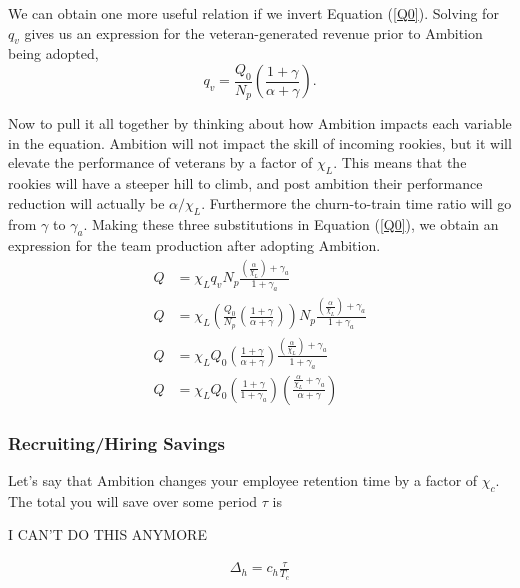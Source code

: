 \documentclass[paper=a4, fontsize=11pt abstract]{scrartcl}
\numberwithin{equation}{section}		%
\numberwithin{figure}{section}			%
\numberwithin{table}{section}				%
\begin{document}
We can obtain one more useful relation if we invert Equation (\ref{Q0}).  Solving for $q_{v}$ gives us an expression for the veteran-generated revenue prior to Ambition being adopted,
\begin{equation}
    q_{v} = \frac{Q_0}{N_p}\left(\frac{1 + \gamma}{\alpha + \gamma}\right).
\end{equation}

Now to pull it all together by thinking about how Ambition impacts each variable in the equation.  Ambition will not impact the skill of incoming rookies, but it will elevate the performance of veterans by a factor of $\chi_L$.  This means that the rookies will have a steeper hill to climb, and post ambition their performance reduction will actually be $\alpha / \chi_L$.  Furthermore the churn-to-train time ratio will go from $\gamma$ to $\gamma_a$.  Making these three substitutions in Equation (\ref{Q0}), we obtain an expression for the team production after adopting Ambition.
\begin{align}
    Q &= \chi_L q_{v} N_p \frac{\left(\frac{\alpha}{\chi_L}\right) + \gamma_a}{1 + \gamma_a} \\
    Q &= \chi_L \left(     \frac{Q_0}{N_p}\left(\frac{1 + \gamma}{\alpha + \gamma}\right)             \right) N_p \frac{\left(\frac{\alpha}{\chi_L}\right) + \gamma_a}{1 + \gamma_a} \\
    Q &= \chi_L Q_0  \left(\frac{1 + \gamma}{\alpha + \gamma}  \right)  \frac{\left(\frac{\alpha}{\chi_L}\right) + \gamma_a}{1 + \gamma_a} \\
    Q &= \chi_L Q_0  \left(\frac{1+\gamma}{1 + \gamma_a}\right) \left(\frac{\frac{\alpha}{\chi_L} + \gamma_a  }{\alpha + \gamma}\right)
\end{align}

\subsubsection{Recruiting/Hiring Savings}
Let's say that Ambition changes your employee retention time by a factor of $\chi_c$. The total you will save over some period $\tau$ is 

I CAN'T DO THIS ANYMORE

\begin{align}
\Delta_h = c_h \frac{\tau}{T_c}
\end{align}

\end{document}
